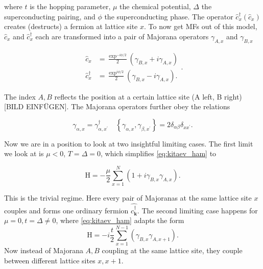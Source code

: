 where $t$ is the hopping parameter, $\mu$ the chemical potential, $\Delta$ the superconducting pairing, and $\phi$ the superconducting phase. The operator $\hat{c}_x^\dagger (\hat{c}_x)$  creates (destructs) a fermion at lattice site $x$. To now get MFs out of this model, $\hat{c}_x$ and $\hat{c}_x^\dagger$ each are transformed into a pair of Majorana operators $\gamma_{A,x}$ and $\gamma_{B,x}$ 

\begin{equation}
	\begin{aligned}
		\hat{c}_x &= \frac{\exp^{-i\phi/2}}{2} \left( \gamma_{B,x} + i\gamma_{A,x}\right) \\
		\hat{c}_x^\dagger &=  \frac{\exp^{i\phi/2}}{2} \left( \gamma_{B,x} - i\gamma_{A,x}\right).
	\end{aligned}
	\label{eq:majorana_operators}.
\end{equation}

The index $A,B$ reflects the position at a certain lattice site (A left, B right) [BILD EINFÜGEN]. The Majorana operators further obey the relations 

\begin{equation}
	\gamma_{\alpha,x} = \gamma_{\alpha,x^\prime}^\dagger	\quad	\left\{\gamma_{\alpha,x},\gamma_{\beta,x^\prime}\right\}=2\delta_{\alpha\beta}\delta_{xx^\prime} 
	\label{vertauschungsrelation majorana-operatoren}.
\end{equation}

Now we are in a position to look at two insightful limiting cases. The first limit we look at is $\mu < 0$, $T=\Delta=0$, which simplifies \eqref{eq:kitaev_ham} to

\begin{equation}
	\mathrm{H}=-\frac{\mu}{2} \sum_{x=1}^N \left( 1+i\gamma_{B,x}\gamma_{A,x}\right)
	\label{eq:kitaev_limit1}. 
\end{equation}

This is the trivial regime. Here every pair of Majoranas at the same lattice site $x$ couples and forms one ordinary fermion $\hat{c_\mathbf{k}^\dagger}$. 
The second limiting case happens for $\mu=0, t=\Delta \neq 0$, where \eqref{eq:kitaev_ham} adapts the form 
\begin{equation}
	\mathrm{H} = -i\frac{t}{2}\sum_{x=1}^{N-1} \left( \gamma_{B,x} \gamma_{A,x+1}\right)
	\label{eq:kitaev_limit2}.
\end{equation}
Now instead of Majorana $A,B$ coupling at the same lattice site, they couple between different lattice sites $x, x+1$. 


